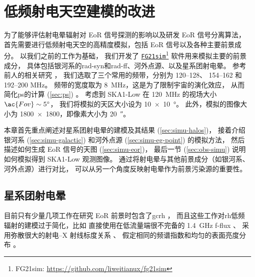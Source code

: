 

\chapter{低频射电天空建模的改进}
\label{chap:simulation}

为了能够评估射电晕辐射对 EoR 信号探测的影响以及研发 EoR 信号分离算法，
首先需要进行低频射电天空的高精度模拟，包括 EoR 信号以及各种主要前景成分。
以我们之前的工作\cite{wang2010,wang2013}为基础，
我们开发了
\href{https://github.com/liweitianux/fg21sim}{\texttt{FG21sim}}\footnote{%
  FG21sim: \url{https://github.com/liweitianux/fg21sim}}
软件用来模拟主要的前景成分，
具体包括银河系的\ac{rad-syn}和\ac{rad-ff}、河外点源、以及星系团射电晕。
参考前人的相关研究 \cite{liu2009ps,datta2010,chapman2012,sims2016}，
我们选取了三个常用的频带，分别为 \numrange{120}{128}、
\numrange{154}{162} 和 \numrange{192}{200} \si{\MHz}。
频带的宽度取为 \SI{8}{\MHz}，这是为了限制宇宙的演化效应，
从而简化\ac{ps}的计算 (\autoref{sec:ps}) \cite{wyithe2004,thyagarajan2013}。
考虑到 SKA1-Low 在 \SI{120}{\MHz} 的视场大小 $\ac{Fov} \sim \SI{5}{\degree}$，
我们将模拟的天区大小设为 \SI{10 x 10}{\degree}。
此外，模拟的图像大小为 \num{1800 x 1800}，即像素大小为 \SI{20}{\arcsecond}。

本章首先重点阐述对星系团射电晕的建模及其结果 (\autoref{sec:simu-halos})，
接着介绍银河系 (\autoref{sec:simu-galactic})
和河外点源 (\autoref{sec:simu-eg-point}) 的模拟方法，
然后描述如何生成 EoR 信号的天图 (\autoref{sec:simu-eor})，
最后一节 (\autoref{sec:obs-simu}) 说明如何模拟得到 SKA1-Low 观测图像。
通过将射电晕与其他前景成分（如银河系、河外点源）进行对比，
可以从另一个角度反映射电晕作为前景污染源的重要性。


\section{星系团射电晕}
\label{sec:simu-halos}

目前只有少量几项工作在研究 EoR 前景时包含了\ac{gc}\ac{rh}
\cite{diMatteo2004,gleser2008,jelic2008}，
而且这些工作对\ac{rh}低频辐射的建模过于简化，比如
直接使用在低流量端很不完备的 \SI{1.4}{\GHz} \ac{f-flux} \cite{gleser2008}、
采用弥散很大的射电--X 射线标度关系 \cite{jelic2008}、
假定相同的频谱指数和均匀的表面亮度分布 \cite{gleser2008,jelic2008}。


